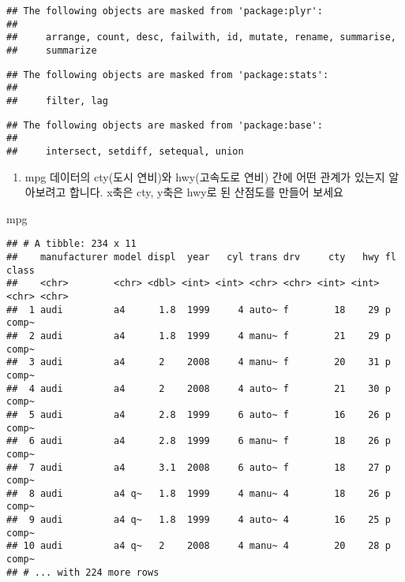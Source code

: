 \documentclass[]{article}
\newenvironment{Shaded}{\begin{snugshade}}{\end{snugshade}}
\newcommand{\NormalTok}[1]{#1}
\providecommand{\tightlist}{%
  \setlength{\itemsep}{0pt}\setlength{\parskip}{0pt}}
\begin{document}
\begin{verbatim}
## The following objects are masked from 'package:plyr':
## 
##     arrange, count, desc, failwith, id, mutate, rename, summarise,
##     summarize
\end{verbatim}

\begin{verbatim}
## The following objects are masked from 'package:stats':
## 
##     filter, lag
\end{verbatim}

\begin{verbatim}
## The following objects are masked from 'package:base':
## 
##     intersect, setdiff, setequal, union
\end{verbatim}

\begin{enumerate}
\def\labelenumi{\arabic{enumi}.}
\tightlist
\item
  mpg 데이터의 cty(도시 연비)와 hwy(고속도로 연비) 간에 어떤 관계가
  있는지 알아보려고 합니다. x축은 cty, y축은 hwy로 된 산점도를 만들어
  보세요
\end{enumerate}

\begin{Shaded}
\begin{Highlighting}[]
\NormalTok{mpg}
\end{Highlighting}
\end{Shaded}

\begin{verbatim}
## # A tibble: 234 x 11
##    manufacturer model displ  year   cyl trans drv     cty   hwy fl    class
##    <chr>        <chr> <dbl> <int> <int> <chr> <chr> <int> <int> <chr> <chr>
##  1 audi         a4      1.8  1999     4 auto~ f        18    29 p     comp~
##  2 audi         a4      1.8  1999     4 manu~ f        21    29 p     comp~
##  3 audi         a4      2    2008     4 manu~ f        20    31 p     comp~
##  4 audi         a4      2    2008     4 auto~ f        21    30 p     comp~
##  5 audi         a4      2.8  1999     6 auto~ f        16    26 p     comp~
##  6 audi         a4      2.8  1999     6 manu~ f        18    26 p     comp~
##  7 audi         a4      3.1  2008     6 auto~ f        18    27 p     comp~
##  8 audi         a4 q~   1.8  1999     4 manu~ 4        18    26 p     comp~
##  9 audi         a4 q~   1.8  1999     4 auto~ 4        16    25 p     comp~
## 10 audi         a4 q~   2    2008     4 manu~ 4        20    28 p     comp~
## # ... with 224 more rows
\end{verbatim}
\end{document}
